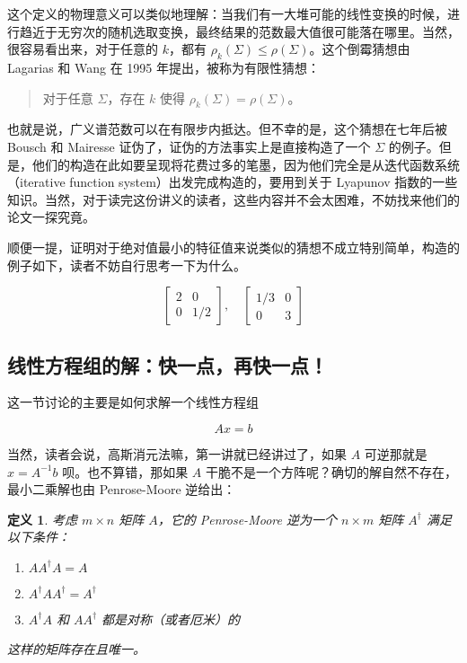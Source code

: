 \documentclass{ctexbook}
\newtheorem{definition}{定义}[chapter] %
\begin{document}
这个定义的物理意义可以类似地理解：当我们有一大堆可能的线性变换的时候，进行趋近于无穷次的随机选取变换，最终结果的范数最大值很可能落在哪里。当然，很容易看出来，对于任意的 $k$，都有 $\rho_k(\Sigma) \leqslant \rho(\Sigma)$。这个倒霉猜想由 Lagarias 和 Wang 在 1995 年提出，被称为有限性猜想：

\begin{quote}
    \kaishu
    对于任意 $\Sigma$，存在 $k$ 使得 $\rho_k(\Sigma) = \rho(\Sigma)$。
\end{quote}

也就是说，广义谱范数可以在有限步内抵达。但不幸的是，这个猜想在七年后被 Bousch 和 Mairesse 证伪了，证伪的方法事实上是直接构造了一个 $\Sigma$ 的例子。但是，他们的构造在此如要呈现将花费过多的笔墨，因为他们完全是从迭代函数系统（iterative function system）出发完成构造的，要用到关于 Lyapunov 指数的一些知识。当然，对于读完这份讲义的读者，这些内容并不会太困难，不妨找来他们的论文一探究竟。

顺便一提，证明对于绝对值最小的特征值来说类似的猜想不成立特别简单，构造的例子如下，读者不妨自行思考一下为什么。

\[
\begin{bmatrix}
2 & 0 \\ 0 & 1/2
\end{bmatrix}, \quad \begin{bmatrix}
1/3 & 0 \\ 0 & 3
\end{bmatrix}
\]

\subsection{线性方程组的解：快一点，再快一点！}

这一节讨论的主要是如何求解一个线性方程组

\[
Ax = b
\]

当然，读者会说，高斯消元法嘛，第一讲就已经讲过了，如果 $A$ 可逆那就是 $x = A^{-1}b$ 呗。也不算错，那如果 $A$ 干脆不是一个方阵呢？确切的解自然不存在，最小二乘解也由 Penrose-Moore 逆给出：

\begin{definition}
    考虑 $m \times n$ 矩阵 $A$，它的 Penrose-Moore 逆为一个 $n \times m$ 矩阵 $A^\dagger$ 满足以下条件：

    \begin{enumerate}
        \item $A A^\dagger A = A$
        \item $A^\dagger A A^\dagger = A^\dagger$
        \item $A^\dagger A$ 和 $AA^\dagger$ 都是对称（或者厄米）的
    \end{enumerate}

    这样的矩阵存在且唯一。
\end{definition}
\end{document}
